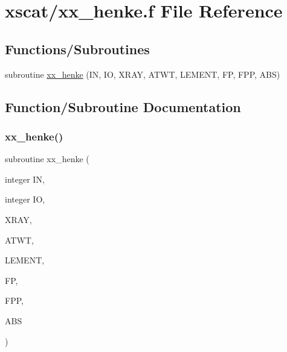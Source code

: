 \hypertarget{xx__henke_8f}{}\section{xscat/xx\+\_\+henke.f File Reference}
\label{xx__henke_8f}
\subsection*{Functions/\+Subroutines}
\begin{DoxyCompactItemize}
\item 
subroutine \hyperlink{xx__henke_8f_a01303fb6bfea32b8ab85f4f9e9716f62}{xx\+\_\+henke} (IN, IO, X\+R\+AY, A\+T\+WT, L\+E\+M\+E\+NT, FP, F\+PP, A\+BS)
\end{DoxyCompactItemize}


\subsection{Function/\+Subroutine Documentation}
\mbox{\label{xx__henke_8f_a01303fb6bfea32b8ab85f4f9e9716f62}} 
\subsubsection{\texorpdfstring{xx\+\_\+henke()}{xx\_henke()}}
{\footnotesize\ttfamily subroutine xx\+\_\+henke (\begin{DoxyParamCaption}\item[{integer}]{IN,  }\item[{integer}]{IO,  }\item[{}]{X\+R\+AY,  }\item[{}]{A\+T\+WT,  }\item[{}]{L\+E\+M\+E\+NT,  }\item[{}]{FP,  }\item[{}]{F\+PP,  }\item[{}]{A\+BS }\end{DoxyParamCaption})}

